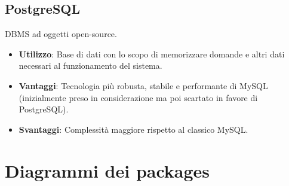 \documentclass[a4paper,11pt]{article}
\begin{document}
	\subsection{PostgreSQL}
	DBMS ad oggetti open-source.
	\begin{itemize}
		\item\textbf{Utilizzo}: Base di dati con lo scopo di memorizzare domande e altri dati necessari al funzionamento del sistema.
		\item\textbf{Vantaggi}: Tecnologia più robusta, stabile e performante di MySQL (inizialmente preso in considerazione ma poi scartato in favore di PostgreSQL).
		\item\textbf{Svantaggi}: Complessità maggiore rispetto al classico MySQL.
	\end{itemize}
	\newpage
	\section{Diagrammi dei packages}
\end{document}
